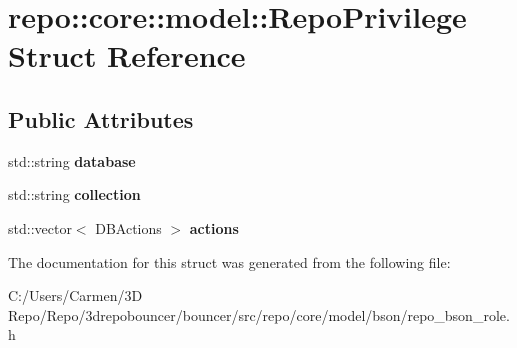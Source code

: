 \hypertarget{structrepo_1_1core_1_1model_1_1_repo_privilege}{}\section{repo\+:\+:core\+:\+:model\+:\+:Repo\+Privilege Struct Reference}
\label{structrepo_1_1core_1_1model_1_1_repo_privilege}
\subsection*{Public Attributes}
\begin{DoxyCompactItemize}
\item 
\hypertarget{structrepo_1_1core_1_1model_1_1_repo_privilege_ae66e9b0f4e6277846c3bb595a2aeac94}{}std\+::string {\bfseries database}\label{structrepo_1_1core_1_1model_1_1_repo_privilege_ae66e9b0f4e6277846c3bb595a2aeac94}

\item 
\hypertarget{structrepo_1_1core_1_1model_1_1_repo_privilege_a3204de8ddd535e806a88f534babe7b16}{}std\+::string {\bfseries collection}\label{structrepo_1_1core_1_1model_1_1_repo_privilege_a3204de8ddd535e806a88f534babe7b16}

\item 
\hypertarget{structrepo_1_1core_1_1model_1_1_repo_privilege_ab9d0732f23ce39feb5d9c02b27703e1a}{}std\+::vector$<$ D\+B\+Actions $>$ {\bfseries actions}\label{structrepo_1_1core_1_1model_1_1_repo_privilege_ab9d0732f23ce39feb5d9c02b27703e1a}

\end{DoxyCompactItemize}


The documentation for this struct was generated from the following file\+:\begin{DoxyCompactItemize}
\item 
C\+:/\+Users/\+Carmen/3\+D Repo/\+Repo/3drepobouncer/bouncer/src/repo/core/model/bson/repo\+\_\+bson\+\_\+role.\+h\end{DoxyCompactItemize}
